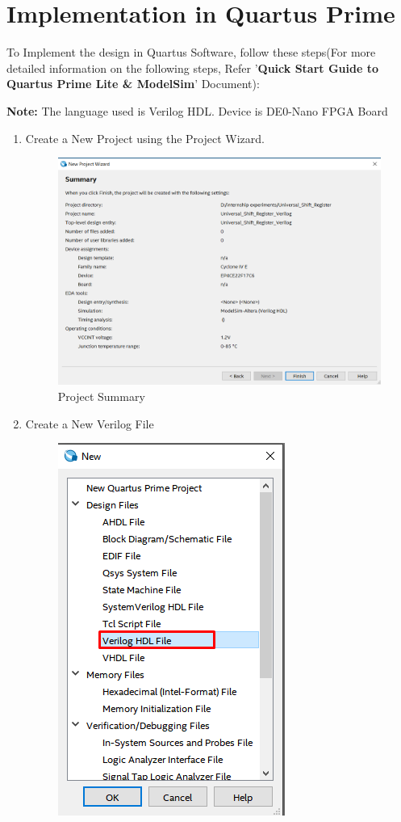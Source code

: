 \documentclass[12pt]{article}
\begin{document}
\newpage
\section{Implementation in Quartus Prime}
To Implement the design in Quartus Software, follow these steps(For more detailed information on the following steps, Refer '\textbf{Quick Start Guide to Quartus Prime Lite & ModelSim}' Document):

\noindent \textbf{Note:} The language used is Verilog HDL. Device is DE0-Nano FPGA Board
\begin{enumerate}
    \item Create a New Project using the Project Wizard.
    \begin{figure}[H]
        \centering
        \includegraphics[scale=0.7]{USR1.png}
        \caption{Project Summary}
    \end{figure}
    \item Create a New Verilog File
    \begin{figure}[H]
        \centering
        \includegraphics[scale=0.5]{Implementation_quartus/2.png}

\end{figure}
\end{enumerate}
\end{document}
